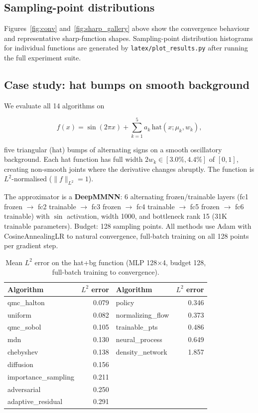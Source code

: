 \documentclass[11pt,a4paper]{article}
\begin{document}
\subsection{Sampling-point distributions}

Figures~\ref{fig:conv} and~\ref{fig:sharp_gallery} above show the
convergence behaviour and representative sharp-function shapes.
Sampling-point distribution histograms for individual functions are
generated by \texttt{latex/plot\_results.py} after running the full
experiment suite.

\subsection{Case study: hat bumps on smooth background}

We evaluate all 14 algorithms on

\begin{equation}
  f(x) = \sin(2\pi x) + \sum_{k=1}^5 a_k\,\mathrm{hat}(x;\mu_k,w_k),
\end{equation}

five triangular (hat) bumps of alternating signs on a smooth oscillatory
background.  Each hat function has full width $2w_k\in[3.0\%,4.4\%]$ of
$[0,1]$, creating non-smooth joints where the derivative changes abruptly.
The function is $L^2$-normalised ($\|f\|_{L^2}=1$).

The approximator is a \textbf{DeepMMNN}: 6 alternating frozen/trainable
layers (fc1 frozen $\to$ fc2 trainable $\to$ fc3 frozen $\to$ fc4 trainable
$\to$ fc5 frozen $\to$ fc6 trainable) with $\sin$ activation, width 1000,
and bottleneck rank 15 (31K trainable parameters).  Budget: 128 sampling
points.  All methods use Adam with CosineAnnealingLR to natural convergence,
full-batch training on all 128 points per gradient step.

\begin{table}[H]
  \centering
  \caption{Mean $L^2$ error on the hat+bg function (MLP 128$\times$4, budget 128,
           full-batch training to convergence).}
  \label{tab:hat_bg}
  \small
  \begin{tabular}{@{}lrlr@{}}
    \toprule
    Algorithm & $L^2$ error & Algorithm & $L^2$ error \\
    \midrule
    qmc\_halton      & 0.079 & policy           & 0.346 \\
    uniform          & 0.082 & normalizing\_flow & 0.373 \\
    qmc\_sobol       & 0.105 & trainable\_pts    & 0.486 \\
    mdn              & 0.130 & neural\_process   & 0.649 \\
    chebyshev        & 0.138 & density\_network  & 1.857 \\
    diffusion        & 0.156 &                  & \\
    importance\_sampling & 0.211 &                & \\
    adversarial      & 0.250 &                  & \\
    adaptive\_residual & 0.291 &                 & \\
    \bottomrule
  \end{tabular}
\end{table}
\end{document}
